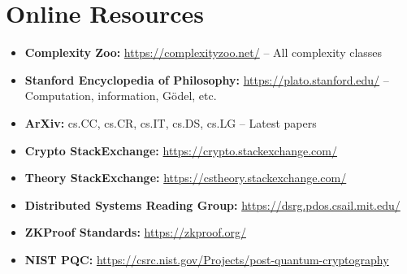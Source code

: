 \section{Online Resources}

\begin{itemize}
\item \textbf{Complexity Zoo:} \url{https://complexityzoo.net/} -- All complexity classes
\item \textbf{Stanford Encyclopedia of Philosophy:} \url{https://plato.stanford.edu/} -- Computation, information, G\"odel, etc.
\item \textbf{ArXiv:} cs.CC, cs.CR, cs.IT, cs.DS, cs.LG -- Latest papers
\item \textbf{Crypto StackExchange:} \url{https://crypto.stackexchange.com/}
\item \textbf{Theory StackExchange:} \url{https://cstheory.stackexchange.com/}
\item \textbf{Distributed Systems Reading Group:} \url{https://dsrg.pdos.csail.mit.edu/}
\item \textbf{ZKProof Standards:} \url{https://zkproof.org/}
\item \textbf{NIST PQC:} \url{https://csrc.nist.gov/Projects/post-quantum-cryptography}
\end{itemize}

